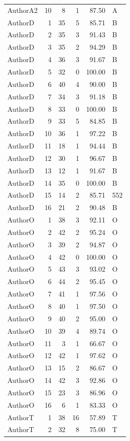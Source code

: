 \begin{longtable}{lrrrrl}
AuthorA2 & 10 & 8 & 1 & 87.50 & A\\
AuthorD & 1 & 35 & 5 & 85.71 & B\\
AuthorD & 2 & 35 & 3 & 91.43 & B\\
AuthorD & 3 & 35 & 2 & 94.29 & B\\
AuthorD & 4 & 36 & 3 & 91.67 & B\\
AuthorD & 5 & 32 & 0 & 100.00 & B\\
AuthorD & 6 & 40 & 4 & 90.00 & B\\
AuthorD & 7 & 34 & 3 & 91.18 & B\\
AuthorD & 8 & 33 & 0 & 100.00 & B\\
AuthorD & 9 & 33 & 5 & 84.85 & B\\
AuthorD & 10 & 36 & 1 & 97.22 & B\\
AuthorD & 11 & 18 & 1 & 94.44 & B\\
AuthorD & 12 & 30 & 1 & 96.67 & B\\
AuthorD & 13 & 12 & 1 & 91.67 & B\\
AuthorD & 14 & 35 & 0 & 100.00 & B\\
AuthorD & 15 & 14 & 2 & 85.71 & 552\\
AuthorD & 16 & 21 & 2 & 90.48 & B\\
AuthorO & 1 & 38 & 3 & 92.11 & O\\
AuthorO & 2 & 42 & 2 & 95.24 & O\\
AuthorO & 3 & 39 & 2 & 94.87 & O\\
AuthorO & 4 & 42 & 0 & 100.00 & O\\
AuthorO & 5 & 43 & 3 & 93.02 & O\\
AuthorO & 6 & 44 & 2 & 95.45 & O\\
AuthorO & 7 & 41 & 1 & 97.56 & O\\
AuthorO & 8 & 40 & 1 & 97.50 & O\\
AuthorO & 9 & 40 & 2 & 95.00 & O\\
AuthorO & 10 & 39 & 4 & 89.74 & O\\
AuthorO & 11 & 3 & 1 & 66.67 & O\\
AuthorO & 12 & 42 & 1 & 97.62 & O\\
AuthorO & 13 & 15 & 2 & 86.67 & O\\
AuthorO & 14 & 42 & 3 & 92.86 & O\\
AuthorO & 15 & 23 & 3 & 86.96 & O\\
AuthorO & 16 & 6 & 1 & 83.33 & O\\
AuthorT & 1 & 38 & 16 & 57.89 & T\\
AuthorT & 2 & 32 & 8 & 75.00 & T\\

\end{longtable}
